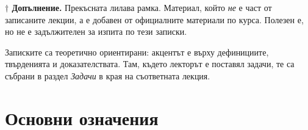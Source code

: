 \begin{tcolorbox}[enhanced, colback=white, colframe=suppframe, boxrule=0.5pt,
  frame style={dash pattern=on 3pt off 2pt}, arc=2.4mm, left=2.6mm, right=2.6mm,
  top=1.8mm, bottom=1.8mm, before skip=0.7em, after skip=0.7em]
\textbf{\color{suppframe}$\dagger$ Допълнение.} Прекъсната лилава рамка. Материал,
който \emph{не} е част от записаните лекции, а е добавен от официалните
материали по курса. Полезен е, но не е задължителен за изпита по тези записки.
\end{tcolorbox}

Записките са теоретично ориентирани: акцентът е върху дефинициите, твърденията и
доказателствата. Там, където лекторът е поставял задачи, те са събрани в раздел
\emph{Задачи} в края на съответната лекция.

\chapter*{Основни означения}

